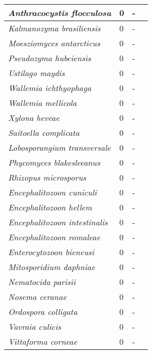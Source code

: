 {\begin{longtable}{| L{4cm} | L{2cm}  | L{5cm} | L{4cm} |}
\textit{Anthracocystis flocculosa} & 0 & - & \\ \hline
\textit{Kalmanozyma brasiliensis} & 0 & - & \\ \hline
\textit{Moesziomyces antarcticus} & 0 & - & \\ \hline
\textit{Pseudozyma hubeiensis} & 0 & - & \\ \hline
\textit{Ustilago maydis} & 0 & - & \\ \hline
\textit{Wallemia ichthyophaga} & 0 & - & \\ \hline
\textit{Wallemia mellicola} & 0 & - & \\ \hline
\textit{Xylona heveae} & 0 & - & \\ \hline
\textit{Saitoella complicata} & 0 & - & \\ \hline
\textit{Lobosporangium transversale} & 0 & - & \\ \hline
\textit{Phycomyces blakesleeanus} & 0 & - & \\ \hline
\textit{Rhizopus microsporus} & 0 & - & \\ \hline
\textit{Encephalitozoon cuniculi} & 0 & - & \\ \hline
\textit{Encephalitozoon hellem} & 0 & - & \\ \hline
\textit{Encephalitozoon intestinalis} & 0 & - & \\ \hline
\textit{Encephalitozoon romaleae} & 0 & - & \\ \hline
\textit{Enterocytozoon bieneusi} & 0 & - & \\ \hline
\textit{Mitosporidium daphniae} & 0 & - & \\ \hline
\textit{Nematocida parisii} & 0 & - & \\ \hline
\textit{Nosema ceranae} & 0 & - & \\ \hline
\textit{Ordospora colligata} & 0 & - & \\ \hline
\textit{Vavraia culicis} & 0 & - & \\ \hline
\textit{Vittaforma corneae} & 0 & - & \\ \hline



\end{longtable}}
